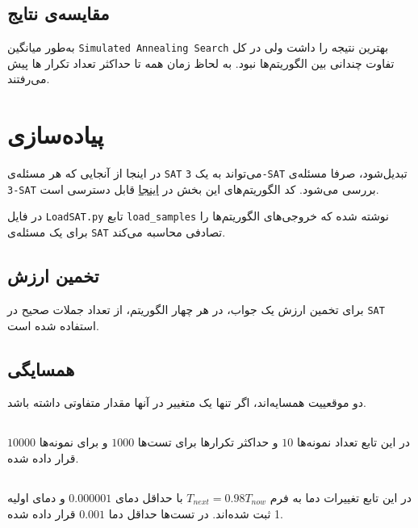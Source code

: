 \section{مقایسه‌ی نتایج}


به‌طور میانگین
\verb;Simulated Annealing Search;
بهترین نتیجه را داشت ولی در کل تفاوت چندانی بین الگوریتم‌ها نبود.
به لحاظ زمان همه تا حداکثر تعداد تکرار ها پیش می‌رفتند.

\chapter{پیاده‌سازی }
در اینجا
از آنجایی که هر مسئله‌ی
\verb;SAT;
می‌تواند به یک
\verb;3-SAT;
تبدیل‌شود،
 صرفا مسئله‌ی
\verb;3-SAT;
بررسی می‌شود.
کد الگوریتم‌های این بخش در 
\href{https://github.com/atrin-hojjat/Uni-AI-Course-Reports/blob/main/Report\%2003/code/SAT/}{اینجا}
قابل دسترسی است.

در فایل
\verb;LoadSAT.py;
تابع 
\verb;load_samples;
نوشته شده که خروجی‌های الگوریتم‌ها را برای یک مسئله‌ی
\verb;SAT;
تصادفی محاسبه می‌کند.



\section{تخمین ارزش}
برای تخمین ارزش یک جواب، در هر چهار الگوریتم، از تعداد جملات صحیح در
\verb;SAT;
استفاده شده است.

\section{همسایگی}
دو موقعییت همسایه‌اند، اگر تنها یک متغییر در آنها مقدار متفاوتی داشته باشد.

\section{}
در این تابع تعداد نمونه‌ها 
$10$
و  حداکثر تکرار‌ها برای تست‌ها
$1000$
و برای نمونه‌ها
$10000$
قرار داده شده.
\section{}
در این تابع 
تغییرات دما به فرم 
$T_{next}=0.98 T_{now}$
با حداقل دمای  $0.000001$ و دمای اولیه 1 ثبت شده‌اند.
در تست‌ها حداقل دما 
$0.001$
قرار داده شده.

